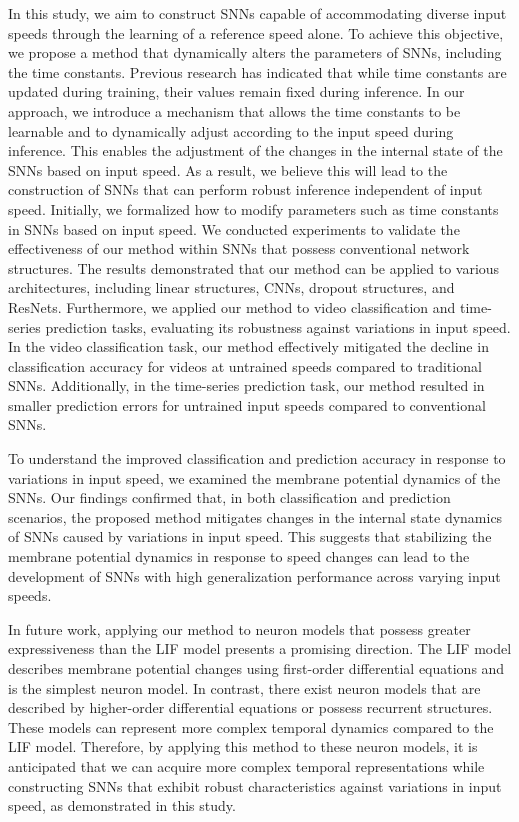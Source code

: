 In this study, we aim to construct SNNs capable of accommodating diverse input speeds through the learning of a reference speed alone. 
To achieve this objective, we propose a method that dynamically alters the parameters of SNNs, including the time constants. 
Previous research has indicated that while time constants are updated during training, their values remain fixed during inference. 
In our approach, we introduce a mechanism that allows the time constants to be learnable and to dynamically adjust according to the input speed during inference. 
This enables the adjustment of the changes in the internal state of the SNNs based on input speed. 
As a result, we believe this will lead to the construction of SNNs that can perform robust inference independent of input speed.
Initially, we formalized how to modify parameters such as time constants in SNNs based on input speed. 
We conducted experiments to validate the effectiveness of our method within SNNs that possess conventional network structures. 
The results demonstrated that our method can be applied to various architectures, including linear structures, CNNs, dropout structures, and ResNets. 
Furthermore, we applied our method to video classification and time-series prediction tasks, evaluating its robustness against variations in input speed. 
In the video classification task, our method effectively mitigated the decline in classification accuracy for videos at untrained speeds compared to traditional SNNs. 
Additionally, in the time-series prediction task, our method resulted in smaller prediction errors for untrained input speeds compared to conventional SNNs.

To understand the improved classification and prediction accuracy in response to variations in input speed, we examined the membrane potential dynamics of the SNNs. 
Our findings confirmed that, in both classification and prediction scenarios, the proposed method mitigates changes in the internal state dynamics of SNNs caused by variations in input speed. 
This suggests that stabilizing the membrane potential dynamics in response to speed changes can lead to the development of SNNs with high generalization performance across varying input speeds.

In future work, applying our method to neuron models that possess greater expressiveness than the LIF model presents a promising direction. 
The LIF model describes membrane potential changes using first-order differential equations and is the simplest neuron model. 
In contrast, there exist neuron models that are described by higher-order differential equations or possess recurrent structures. 
These models can represent more complex temporal dynamics compared to the LIF model. 
Therefore, by applying this method to these neuron models, it is anticipated that we can acquire more complex temporal representations while constructing SNNs that exhibit robust characteristics against variations in input speed, as demonstrated in this study.

\clearpage
\pagestyle{fancy}